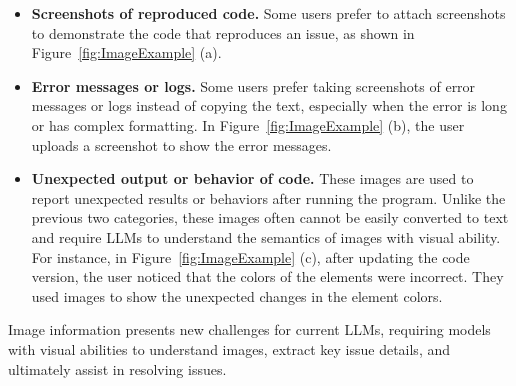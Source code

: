 \begin{itemize}[left=10pt]
    \item \textbf{Screenshots of reproduced code.}  Some users prefer to attach screenshots to demonstrate the code that reproduces an issue, as shown in Figure~\ref{fig:ImageExample} (a). 
 
    
    \item \textbf{Error messages or logs.}  Some users prefer taking screenshots of error messages or logs instead of copying the text, especially when the error is long or has complex formatting. In Figure~\ref{fig:ImageExample} (b), the user uploads a screenshot to show the error messages.
    

    
    \item \textbf{Unexpected output or behavior of code.} These images are used to report unexpected results or behaviors after running the program.
    Unlike the previous two categories, these images often cannot be easily converted to text and require LLMs to understand the semantics of images with visual ability. For instance, in Figure~\ref{fig:ImageExample} (c), after updating the code version, the user noticed that the colors of the elements were incorrect. They used images to show the unexpected changes in the element colors. 

\end{itemize}
Image information presents new challenges for current LLMs, requiring models with visual abilities to understand images, extract key issue details, and ultimately assist in resolving issues.

